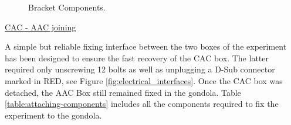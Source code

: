 \begin{figure}[H]
    \noindent{}
    \caption{Bracket Components.}
    \label{fig:bracket}
\end{figure}

\bigskip
\underline{CAC - AAC joining}

\smallskip
A simple but reliable fixing interface between the two boxes of the experiment has been designed to ensure the fast recovery of the CAC box. The latter required only unscrewing 12 bolts as well as unplugging a D-Sub connector marked in RED, see Figure \ref{fig:electrical_interfaces}. Once the CAC box was detached, the AAC Box still remained fixed in the gondola. Table \ref{table:attaching-components} includes all the components required to fix the experiment to the gondola.

